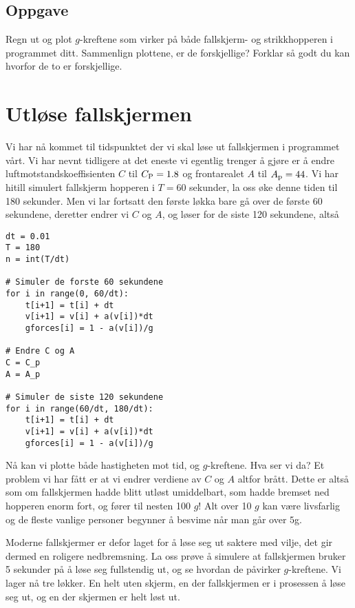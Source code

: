 \documentclass[a4paper, 11pt, notitlepage]{article}
\begin{document}
\subsection*{Oppgave}
Regn ut og plot $g$-kreftene som virker på både fallskjerm- og strikkhopperen i programmet ditt. Sammenlign plottene, er de forskjellige? Forklar så godt du kan hvorfor de to er forskjellige.

\clearpage

\section*{Utløse fallskjermen}
Vi har nå kommet til tidspunktet der vi skal løse ut fallskjermen i programmet vårt. Vi har nevnt tidligere at det eneste vi egentlig trenger å gjøre er å endre luftmotstandskoeffisienten $C$ til $C_{\rm P} = 1.8$ og frontarealet $A$ til $A_{\rm p} = 44$. Vi har hitill simulert fallskjerm hopperen i $T=60$ sekunder, la oss øke denne tiden til 180 sekunder. Men vi lar fortsatt den første løkka bare gå over de første 60 sekundene, deretter endrer vi $C$ og $A$, og løser for de siste 120 sekundene, altså
\begin{lstlisting}
dt = 0.01
T = 180
n = int(T/dt)

# Simuler de forste 60 sekundene
for i in range(0, 60/dt):
    t[i+1] = t[i] + dt
    v[i+1] = v[i] + a(v[i])*dt
    gforces[i] = 1 - a(v[i])/g

# Endre C og A
C = C_p
A = A_p

# Simuler de siste 120 sekundene
for i in range(60/dt, 180/dt):
    t[i+1] = t[i] + dt
    v[i+1] = v[i] + a(v[i])*dt
    gforces[i] = 1 - a(v[i])/g
\end{lstlisting}

Nå kan vi plotte både hastigheten mot tid, og $g$-kreftene. Hva ser vi da? Et problem vi har fått er at vi endrer verdiene av $C$ og $A$ altfor brått. Dette er altså som om fallskjermen hadde blitt utløst umiddelbart, som hadde bremset ned hopperen enorm fort, og fører til nesten 100 $g$! Alt over 10 $g$ kan være livsfarlig og de fleste vanlige personer begynner å besvime når man går over $5$g.

Moderne fallskjermer er defor laget for å løse seg ut saktere med vilje, det gir dermed en roligere nedbremsning. La oss prøve å simulere at fallskjermen bruker 5 sekunder på å løse seg fullstendig ut, og se hvordan de påvirker $g$-kreftene. Vi lager nå tre løkker. En helt uten skjerm, en der fallskjermen er i prosessen å løse seg ut, og en der skjermen er helt løst ut.
\end{document}
